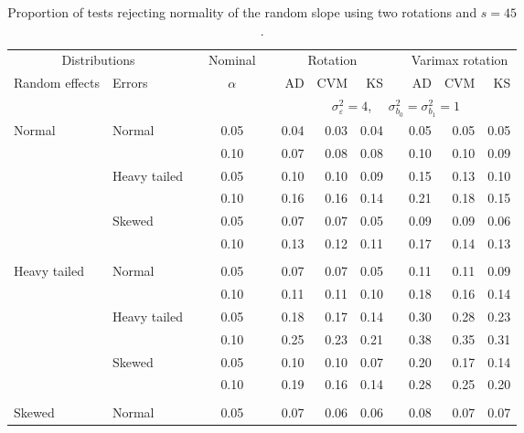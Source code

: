 \begin{table}[ht]
\centering
\caption{\label{tab:simb145}Proportion of tests rejecting normality of the random slope using two rotations and $s = 45$.}
\begin{scriptsize}
\begin{tabular}{ll p{.1cm} c p{.1cm} rrr p{.1cm} rrr}
  \hline
  \multicolumn{2}{c}{Distributions}& & Nominal & &  \multicolumn{3}{c}{Rotation} & & \multicolumn{3}{c}{Varimax rotation} \\ \cline{1-2} \cline{6-8} \cline{10-12}   
  Random effects & Errors & & $\alpha$ & & AD & CVM & KS & & AD & CVM & KS \\ 
   \hline
& && && \multicolumn{7}{c}{$\sigma_{\varepsilon}^2 = 4$, \ \ $\sigma_{b_0}^2 = \sigma_{b_1}^2 = 1$} \\ \cline{6-12}
\rowcolor{gray!20}Normal       & Normal       && 0.05 &&  0.04 & 0.03 & 0.04 && 0.05 & 0.05 & 0.05 \\ 
\rowcolor{gray!20}             &              && 0.10 &&  0.07 & 0.08 & 0.08 && 0.10 & 0.10 & 0.09 \\ 
\rowcolor{gray!20}             & Heavy tailed && 0.05 &&  0.10 & 0.10 & 0.09 && 0.15 & 0.13 & 0.10 \\ 
\rowcolor{gray!20}             &              && 0.10 &&  0.16 & 0.16 & 0.14 && 0.21 & 0.18 & 0.15 \\ 
\rowcolor{gray!20}             & Skewed       && 0.05 &&  0.07 & 0.07 & 0.05 && 0.09 & 0.09 & 0.06 \\ 
\rowcolor{gray!20}             &              && 0.10 &&  0.13 & 0.12 & 0.11 && 0.17 & 0.14 & 0.13 \\ 
             &&&&&&&&&&&\\
Heavy tailed & Normal       && 0.05 &&  0.07 & 0.07 & 0.05 && 0.11 & 0.11 & 0.09 \\ 
             &              && 0.10 &&  0.11 & 0.11 & 0.10 && 0.18 & 0.16 & 0.14 \\ 
             & Heavy tailed && 0.05 &&  0.18 & 0.17 & 0.14 && 0.30 & 0.28 & 0.23 \\ 
             &              && 0.10 &&  0.25 & 0.23 & 0.21 && 0.38 & 0.35 & 0.31 \\ 
             & Skewed       && 0.05 &&  0.10 & 0.10 & 0.07 && 0.20 & 0.17 & 0.14 \\ 
             &              && 0.10 &&  0.19 & 0.16 & 0.14 && 0.28 & 0.25 & 0.20 \\ 
             &&&&&&&&&&&\\
Skewed       & Normal       && 0.05 &&  0.07 & 0.06 & 0.06 && 0.08 & 0.07 & 0.07 \\ 

\end{tabular}
\end{scriptsize}
\end{table}
